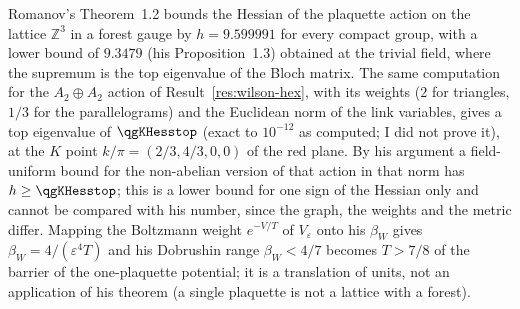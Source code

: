 \documentclass[11pt]{article}
\theoremstyle{definition}
\begin{document}
Romanov's Theorem~1.2 \cite{romanov2026} bounds the Hessian of the plaquette action on the lattice $\mathbb{Z}^3$ in a forest gauge by $h=9.599991$ for every compact group, with a lower bound of $9.3479$ (his Proposition~1.3) obtained at the trivial field, where the supremum is the top eigenvalue of the Bloch matrix. The same computation for the $A_2\oplus A_2$ action of Result~\ref{res:wilson-hex}, with its weights ($2$ for triangles, $1/3$ for the parallelograms) and the Euclidean norm of the link variables, gives a top eigenvalue of $\qgKHesstop$ (exact to $10^{-12}$ as computed; I did not prove it), at the $K$ point $k/\pi=(2/3,4/3,0,0)$ of the red plane. By his argument a field-uniform bound for the non-abelian version of that action in that norm has $h\ge\qgKHesstop$; this is a lower bound for one sign of the Hessian only and cannot be compared with his number, since the graph, the weights and the metric differ. Mapping the Boltzmann weight $e^{-V/T}$ of $V_\varepsilon$ onto his $\beta_W$ gives $\beta_W=4/(\varepsilon^4T)$ and his Dobrushin range $\beta_W<4/7$ becomes $T>7/8$ of the barrier of the one-plaquette potential; it is a translation of units, not an application of his theorem (a single plaquette is not a lattice with a forest).
\end{document}
